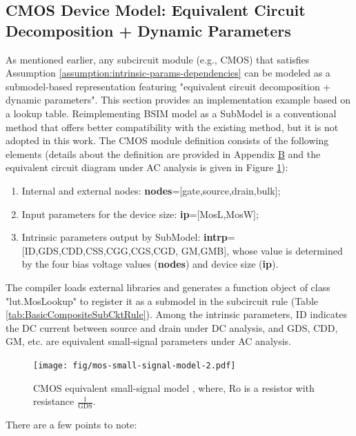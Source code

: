\subsection{CMOS Device Model: Equivalent Circuit Decomposition + Dynamic Parameters}\label{subsec:cmos-model}
As mentioned earlier, any subcircuit module (e.g., CMOS) that satisfies Assumption \ref{assumption:intrinsic-params-dependencies} can be modeled as a submodel-based representation featuring "equivalent circuit decomposition + dynamic parameters". This section provides an implementation example based on a lookup table. Reimplementing BSIM model \cite{chauhan2012bsim} as a SubModel is a conventional method that offers better compatibility with the existing method, but it is not adopted in this work. The CMOS module definition consists of the following elements (details about the definition are provided in Appendix \hyperref[appendix:mos-subckt]{B} and the equivalent circuit diagram under AC analysis is given in Figure \ref{fig:mos-small-signal-model-2}):
\begin{enumerate}[partopsep=0pt,topsep=0pt,itemsep=0pt,parsep=0pt]
  \item Internal and external nodes: \textbf{nodes}=[gate,source,drain,bulk];
  \item Input parameters for the device size: \textbf{ip}=[MosL,MosW];
  \item Intrinsic parameters output by SubModel:
    \textbf{intrp}=[ID,GDS,CDD,CSS,CGG,CGS,CGD, GM,GMB], whose value is determined by the four bias voltage values (\textbf{nodes}) and device size (\textbf{ip}).
\end{enumerate}
The compiler loads external libraries and generates a function object of class "lut.MosLookup" to register it as a submodel in the subcircuit rule (Table \ref{tab:BasicCompositeSubCktRule}). Among the intrinsic parameters, ID indicates the DC current between source and drain under DC analysis, and GDS, CDD, GM, etc. are equivalent small-signal parameters under AC analysis.
\begin{figure}[htpb]
  \centering
  \texttt{[image: fig/mos-small-signal-model-2.pdf]}
  \caption{CMOS equivalent small-signal model \cite[Figure 2.39]{razavi2002design}, where, Ro is a resistor with resistance $\frac{1}{\text{GDS}}$.}
  \label{fig:mos-small-signal-model-2}
\end{figure}
There are a few points to note:
